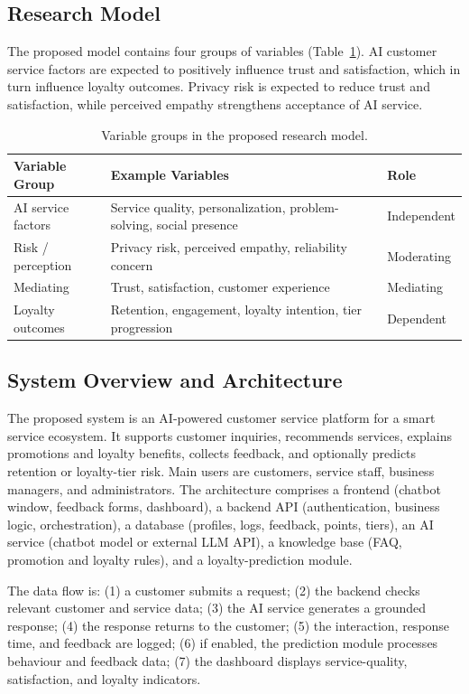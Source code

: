 \documentclass[runningheads]{llncs}
\begin{document}
\subsection{Research Model}
The proposed model contains four groups of variables (Table~\ref{tab:model}). AI customer service factors are expected to positively influence trust and satisfaction, which in turn influence loyalty outcomes. Privacy risk is expected to reduce trust and satisfaction, while perceived empathy strengthens acceptance of AI service.

\begin{table}[t]
\caption{Variable groups in the proposed research model.}\label{tab:model}
\centering
\begin{tabular}{@{}lll@{}}
\toprule
Variable Group & Example Variables & Role \\
\midrule
AI service factors & Service quality, personalization, problem-solving, social presence & Independent \\
Risk / perception & Privacy risk, perceived empathy, reliability concern & Moderating \\
Mediating & Trust, satisfaction, customer experience & Mediating \\
Loyalty outcomes & Retention, engagement, loyalty intention, tier progression & Dependent \\
\bottomrule
\end{tabular}
\end{table}

\subsection{System Overview and Architecture}
The proposed system is an AI-powered customer service platform for a smart service ecosystem. It supports customer inquiries, recommends services, explains promotions and loyalty benefits, collects feedback, and optionally predicts retention or loyalty-tier risk. Main users are customers, service staff, business managers, and administrators. The architecture comprises a frontend (chatbot window, feedback forms, dashboard), a backend API (authentication, business logic, orchestration), a database (profiles, logs, feedback, points, tiers), an AI service (chatbot model or external LLM API), a knowledge base (FAQ, promotion and loyalty rules), and a loyalty-prediction module.

The data flow is: (1) a customer submits a request; (2) the backend checks relevant customer and service data; (3) the AI service generates a grounded response; (4) the response returns to the customer; (5) the interaction, response time, and feedback are logged; (6) if enabled, the prediction module processes behaviour and feedback data; (7) the dashboard displays service-quality, satisfaction, and loyalty indicators.
\end{document}
